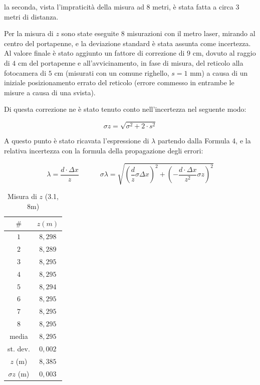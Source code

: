 \documentclass{article}
\begin{document}
la seconda, vista l'impraticità della misura ad 8 metri, è stata fatta a circa 3 metri di distanza.

\vspace{5mm}

Per la misura di $z$ sono state eseguite 8 misurazioni con il metro laser, mirando al centro del portapenne, e la deviazione standard è stata assunta come incertezza. Al valore finale è stato aggiunto un fattore di correzione di $9$ cm, dovuto al raggio di $4$ cm del portapenne e all'avvicinamento, in fase di misura, del reticolo alla fotocamera di $5$ cm (misurati con un comune righello, $s = 1$ mm) a causa di un iniziale posizionamento errato del reticolo (errore commesso in entrambe le misure a causa di una svista).

\vspace{5mm}

Di questa correzione ne è stato tenuto conto nell'incertezza nel seguente modo:

\[\sigma z = \sqrt{ \sigma^2 + 2\cdot s^2}\]

A questo punto è stato ricavata l'espressione di $\lambda$ partendo dalla Formula 4, e la relativa incertezza con la formula della propagazione degli errori:

\[\lambda = \frac{d \cdot \Delta x}{z} \quad \quad \quad \sigma \lambda = \sqrt{\left( \frac{d}{z} \sigma \Delta x \right)^2 + \left( -\frac{d \cdot \Delta x}{z^2}\sigma z \right)^2}\]

\begin{table}
\centering
\begin{tabular}{ | c | c | }
  \hline
  $\#$ & $z (m)$ \\
  \hline
  $1$ & $8,298$ \\
  $2$ & $8,289$ \\
  $3$ & $8,295$ \\
  $4$ & $8,295$ \\
  $5$ & $8,294$ \\
  $6$ & $8,295$ \\
  $7$ & $8,295$ \\
  $8$ & $8,295$ \\
  \hline 
  media & $8,295$ \\
  st. dev. & $0,002$ \\
  \hline
  $z$ (m) & $8,385$ \\
  $\sigma z$ (m) & $0,003$ \\
  \hline
\end{tabular}
\caption{Misura di $z$ (3.1, 8m)}
\end{table}
\end{document}
